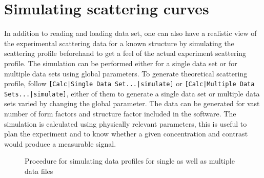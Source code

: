 \section{Simulating scattering curves}

In addition to reading and loading data set, one can also have a
realistic view of the experimental scattering data for a known
structure by simulating the scattering profile beforehand to get a
feel of the actual experiment scattering profile. The simulation can
be performed either for a single data set or for multiple data sets
using global parameters. To generate theoretical scattering profile,
follow \verb"[Calc|Single Data Set...|simulate]" or
\verb"[Calc|Multiple Data Sets...|simulate]", either of them to generate
a single data set or multiple data sets varied by changing the global parameter. The
data can be generated for vast number of form factors and structure
factor included in the software. The simulation is calculated using
physically relevant parameters, this is useful to plan the
experiment and to know whether a given concentration and contrast
would produce a measurable signal.

\begin{figure}[htb]
\centering
\caption{Procedure for simulating data profiles for single as well as multiple data files}
\label{fig:QTsimulateDS}
\end{figure}

